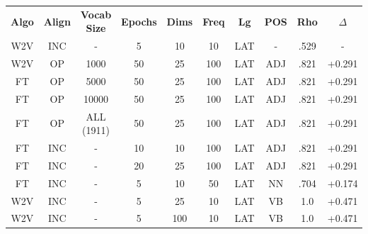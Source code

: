 \begin{table}[h]
\centering
\begin{tabular}{cccccccccc} 
\toprule
\textbf{ Algo } & \textbf{ Align } & \textbf{ Vocab Size } & \textbf{ Epochs } & \textbf{ Dims } & \textbf{ Freq } & \textbf{ Lg } & \textbf{ POS } & \textbf{ Rho } & \textbf{ $\Delta$ }  \\
W2V             & INC              & -                     & 5                 & 10              & 10             & LAT           & -              & .529           & -               \\
W2V             & OP               & 1000                  & 50                & 25              & 100            & LAT           & ADJ            & .821           & +0.291          \\
FT              & OP               & 5000                  & 50                & 25              & 100            & LAT           & ADJ            & .821           & +0.291          \\
FT              & OP               & 10000                 & 50                & 25              & 100            & LAT           & ADJ            & .821           & +0.291          \\
FT              & OP               & ALL (1911)            & 50                & 25              & 100            & LAT           & ADJ            & .821           & +0.291          \\
FT              & INC              & -                     & 10                & 10              & 100            & LAT           & ADJ            & .821           & +0.291          \\
FT              & INC              & -                     & 20                & 25              & 100            & LAT           & ADJ            & .821           & +0.291          \\
FT              & INC              & -                     & 5                 & 10              & 50             & LAT           & NN             & .704           & +0.174          \\
W2V             & INC              & -                     & 5                 & 25              & 10             & LAT           & VB             & 1.0            & +0.471          \\
W2V             & INC              & -                     & 5                 & 100             & 10             & LAT           & VB             & 1.0            & +0.471          \\

\end{tabular}
\end{table}

